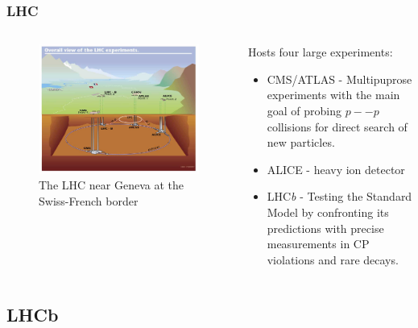 \documentclass[10pt, xcolor={table}]{beamer}
\begin{document}
\begin{frame}[allowframebreaks]
  \frametitle{LHC}

  \begin{columns}
    \begin{column}{0.5\textwidth}
        \begin{figure}
\includegraphics[width=\textwidth]{pics/lhc.jpg}
\caption{The LHC near Geneva at the Swiss-French border}
\end{figure}
    \end{column}
    \begin{column}{0.5\textwidth}
    Hosts four large experiments:
\begin{itemize}
  \item CMS/ATLAS - Multipuprose experiments with the main goal of probing $p--p$ collisions for direct search of new particles.
  \item ALICE - heavy ion detector
  \item LHC\textit{b} - Testing the Standard Model by confronting its predictions with precise measurements in CP violations and rare decays.
\end{itemize}
    \end{column}
  \end{columns}


\end{frame}



\subsection{LHCb} %
\label{sec:lhcb}
\end{document}
